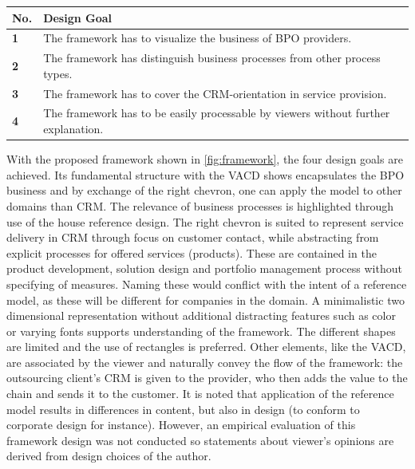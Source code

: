 	 	 	\begin{table}[caption={Design Goals}, label={tab:desobj}]
	 	\centering
	 	\begin{tabular}{l p{13.3cm}}
	 		
	 		\textbf{No. }&\textbf{ Design Goal}
	 		\\ \hline
	 		\textbf{1 }                        & The framework has to visualize the business of BPO providers.                                     \\ \hline
	 		\textbf{2}                         & The framework has distinguish business processes from other process types.                                                                                                                   \\ \hline
	 		\textbf{3 }                        & The framework has to cover the CRM-orientation in service provision. \\ \hline
	 		\textbf{4}                         & The framework has to be easily processable by viewers without further explanation.                                                              
	 		
	 	\end{tabular}
	 \end{table}
 
	 
	 With the proposed framework shown in \Fig \ref{fig:framework}, the four design goals are achieved. Its fundamental structure with the \acrshort{VACD} shows encapsulates the BPO business and by exchange of the right chevron, one can apply the model to other domains than \acrshort{CRM}. The relevance of business processes is highlighted through use of the house reference design. The right chevron is suited to represent service delivery in  \acrshort{CRM} through focus on customer contact, while abstracting from explicit processes for offered services (products). These are contained in the product development, solution design and portfolio management process without specifying of measures. Naming these would conflict with the intent of a reference model, as these will be different for companies in the domain. A minimalistic two dimensional representation without additional distracting features such as color or varying fonts supports understanding of the framework. The different shapes are limited and the use of rectangles is preferred. Other elements, like the \acrshort{VACD}, are associated by the viewer and naturally convey the flow of the framework: the outsourcing client's \acrshort{CRM} is given to the provider, who then adds the value to the chain and sends it to the customer. It is noted that application of the reference model results in differences in content, but also in design (to conform to corporate design for instance). However, an empirical evaluation of this framework design was not conducted so statements about viewer's opinions are derived from design choices of the author. 
	 
